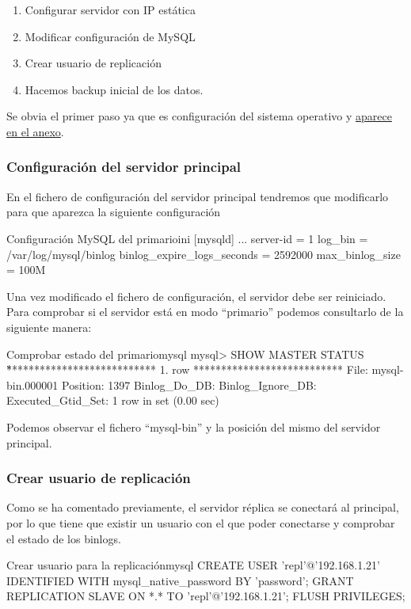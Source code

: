 \begin{enumerate}
    \item Configurar servidor con IP estática
    \item Modificar configuración de MySQL
    \item Crear usuario de replicación
    \item Hacemos backup inicial de los datos.
\end{enumerate}

Se obvia el primer paso ya que es configuración del sistema operativo y \hyperlink{configurar_ip_estatica_ubuntu}{aparece en el anexo}.


\subsubsection{Configuración del servidor principal}
En el fichero de configuración del servidor principal tendremos que modificarlo para que aparezca la siguiente configuración

\begin{mycode}{Configuración MySQL del primario}{ini}{}
[mysqld]
...
server-id = 1
log_bin = /var/log/mysql/binlog
binlog_expire_logs_seconds     = 2592000
max_binlog_size = 100M
\end{mycode}

Una vez modificado el fichero de configuración, el servidor debe ser reiniciado. Para comprobar si el servidor está en modo “primario” podemos consultarlo de la siguiente manera:


\begin{mycode}{Comprobar estado del primario}{mysql}{}
mysql> SHOW MASTER STATUS \G
*************************** 1. row ***************************
File: mysql-bin.000001
Position: 1397
Binlog_Do_DB:
Binlog_Ignore_DB:
Executed_Gtid_Set:
1 row in set (0.00 sec)
\end{mycode}

Podemos observar el fichero “mysql-bin” y la posición del mismo del servidor principal.


\subsubsection{Crear usuario de replicación}
Como se ha comentado previamente, el servidor réplica se conectará al principal, por lo que tiene que existir un usuario con el que poder conectarse y comprobar el estado de los binlogs.

\begin{mycode}{Crear usuario para la replicación}{mysql}{{\footnotesize }}
CREATE USER 'repl'@'192.168.1.21' IDENTIFIED WITH mysql_native_password BY 'password';
GRANT REPLICATION SLAVE ON *.* TO 'repl'@'192.168.1.21';
FLUSH PRIVILEGES;
\end{mycode}


